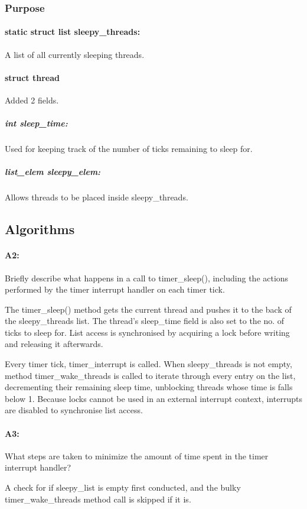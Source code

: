 \documentclass[11pt]{article}
\begin{document}
\subsubsection{Purpose}
\paragraph{static struct list sleepy\_threads:}
A list of all currently sleeping threads.

\paragraph{struct thread}
Added 2 fields.

\subparagraph{int sleep\_time:}
Used for keeping track of the number of ticks remaining to sleep for.
\subparagraph{list\_elem sleepy\_elem:}
Allows threads to be placed inside sleepy\_threads.

\subsection{Algorithms}
\paragraph{A2:}
Briefly describe what happens in a call to timer\_sleep(), including the actions performed by the timer interrupt handler on each timer tick.

The timer\_sleep() method gets the current thread and pushes it to the back of the sleepy\_threads list. The thread's sleep\_time field is also set to the no. of ticks to sleep for. List access is synchronised by acquiring a lock before writing and releasing it afterwards.

Every timer tick, timer\_interrupt is called. When sleepy\_threads is not empty, method timer\_wake\_threads is called to iterate through every entry on the list, decrementing their remaining sleep time, unblocking threads whose time is falls below 1. Because locks cannot be used in an external interrupt context, interrupts are disabled to synchronise list access.

\paragraph{A3:}
What steps are taken to minimize the amount of time spent in the timer interrupt handler?

A check for if sleepy\_list is empty first conducted, and the bulky timer_wake_threads method call is skipped if it is.
\end{document}
